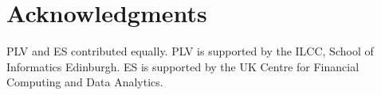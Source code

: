 \documentclass[10pt,letterpaper]{article}
\begin{document}
\section{Acknowledgments}
PLV and ES contributed equally. PLV is supported by the ILCC, School of Informatics Edinburgh. ES is supported by the UK Centre for Financial Computing and Data Analytics.

\setlength{\bibleftmargin}{.125in}
\setlength{\bibindent}{-\bibleftmargin}


\end{document}
